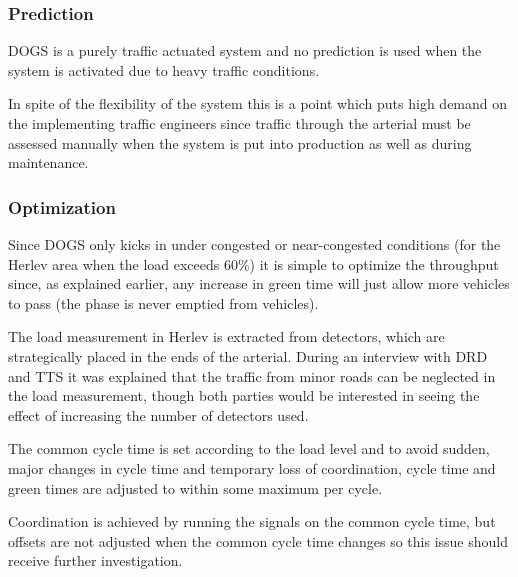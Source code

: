 \subsubsection{Prediction}
DOGS is a purely traffic actuated system and no prediction is used when the system is activated due to heavy traffic conditions.

In spite of the flexibility of the system this is a point which puts high demand on the implementing traffic engineers since traffic through the arterial must be assessed manually when the system is put into production as well as during maintenance.

\subsubsection{Optimization}
Since DOGS only kicks in under congested or near-congested conditions (for the Herlev area when the load exceeds 60\%) it is simple to optimize the throughput since, as explained earlier, any increase in green time will just allow more vehicles to pass (the phase is never emptied from vehicles).

The load measurement in Herlev is extracted from detectors, which are strategically placed in the ends of the arterial. During an interview with DRD and TTS it was explained that the traffic from minor roads can be neglected in the load measurement, though both parties would be interested in seeing the effect of increasing the number of detectors used.

The common cycle time is set according to the load level and to avoid sudden, major changes in cycle time and temporary loss of coordination, cycle time and green times are adjusted to within some maximum per cycle. 

Coordination is achieved by running the signals on the common cycle time, but offsets are not adjusted when the common cycle time changes so this issue should receive further investigation.
